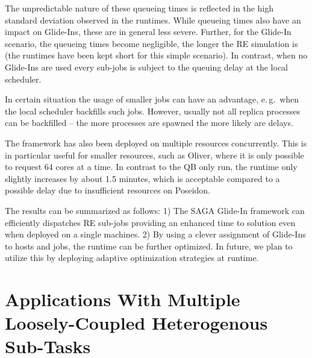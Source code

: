 \documentclass[conference,final]{IEEEtran}
\begin{document}
The unpredictable nature of these queueing times is reflected in the high standard deviation 
observed in the runtimes. While queueing times also have an impact on Glide-Ins, these are in general less
severe.  Further, for the Glide-In scenario, the queueing times become negligible, 
the longer the RE simulation is (the runtimes have been
kept short for this simple scenario). In contrast, when no Glide-Ins are used every sub-jobs 
is subject to the queuing delay at the local scheduler.


In certain situation the usage of smaller jobs can have an advantage, 
e.\,g.\ when the local scheduler backfills such jobs. However, usually not all replica processes can be
backfilled -- the more processes are spawned the more likely are delays. 

The framework has also been deployed on multiple resources concurrently. This is in particular useful
for smaller resources, such as Oliver, where it is only possible to request 64 cores at a
time. In contrast to the QB only run, the runtime only slightly increases by about 1.5 minutes, which is 
acceptable compared to a possible delay due to insufficient resources on Poseidon.

The results can be summarized as follows: 1) The SAGA Glide-In framework can 
efficiently dispatches RE sub-jobs providing an enhanced time to solution even 
when deployed on a single machines. 2) By using a clever assignment of 
Glide-Ins to hosts and jobs, the runtime can 
be further optimized. In future, we plan to utilize this by deploying 
adaptive optimization strategies at runtime.



\section{Applications With Multiple Loosely-Coupled Heterogenous
Sub-Tasks}
\end{document}
